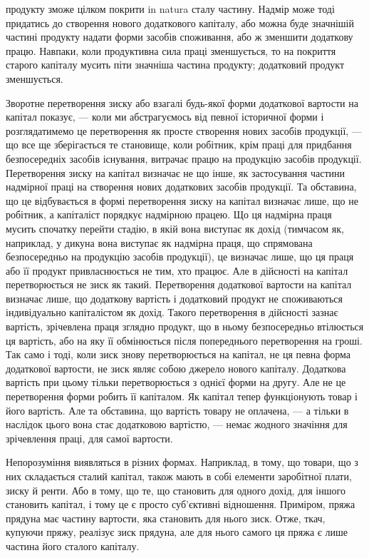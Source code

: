 \parcont{}  %
продукту зможе цілком покрити in natura сталу частину. Надмір може тоді
придатись до створення нового додаткового капіталу, або можна буде значнішій
частині продукту надати форми засобів споживання, або ж зменшити додаткову
працю. Навпаки, коли продуктивна сила праці зменшується, то на покриття старого
капіталу мусить піти значніша частина продукту; додатковий продукт зменшується.

Зворотне перетворення зиску або взагалі будь-якої форми додаткової вартости
на капітал показує, — коли ми абстрагуємось від певної історичної форми
і розглядатимемо це перетворення як просте створення нових засобів продукції, —
що все ще зберігається те становище, коли робітник, крім праці для придбання
безпосередніх засобів існування, витрачає працю на продукцію засобів продукції.
Перетворення зиску на капітал визначає не що інше, як застосування
частини надмірної праці на створення нових додаткових засобів продукції. Та
обставина, що це відбувається в формі перетворення зиску на капітал визначає лише,
що не робітник, а капіталіст порядкує надмірною працею. Що ця надмірна праця
мусить спочатку перейти стадію, в якій вона виступає як дохід (тимчасом як,
наприклад, у дикуна вона виступає як надмірна праця, що спрямована безпосередньо
на продукцію засобів продукції), це визначає лише, що ця праця або
її продукт привласнюється не тим, хто працює. Але в дійсності на капітал
перетворюється не зиск як такий. Перетворення додаткової вартости на капітал
визначає лише, що додаткову вартість і додатковий продукт не споживаються
індивідуально капіталістом як дохід. Такого перетворення в дійсності
зазнає вартість, зрічевлена праця зглядно продукт, що в ньому безпосередньо втілюється ця вартість,
або на яку її обмінюється після попереднього перетворення
на гроші. Так само і тоді, коли зиск знову перетворюється на капітал, не ця
певна форма додаткової вартости, не зиск являє собою джерело нового капіталу.
Додаткова вартість при цьому тільки перетворюється з однієї форми на другу.
Але не це перетворення форми робить її капіталом. Як капітал тепер функціонують
товар і його вартість. Але та обставина, що вартість товару не оплачена, —
а тільки в наслідок цього вона стає додатковою вартістю, — немає жодного значіння
для зрічевлення праці, для самої вартости.

Непорозуміння виявляться в різних формах. Наприклад, в тому, що товари,
що з них складається сталий капітал, також мають в собі елементи заробітної
плати, зиску й ренти. Або в тому, що те, що становить для одного дохід, для
іншого становить капітал, і тому це є просто суб’єктивні відношення. Приміром,
пряжа прядуна має частину вартости, яка становить для нього зиск. Отже, ткач,
купуючи пряжу, реалізує зиск прядуна, але для нього самого ця пряжа є лише
частина його сталого капіталу.

